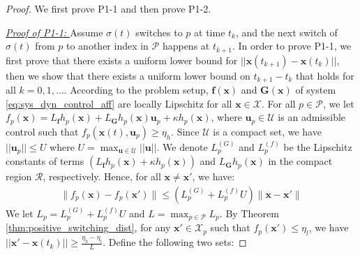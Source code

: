 \documentclass[letterpaper, 10 pt, conference]{ieeeconf}  %
\begin{document}
\begin{proof}
    We first prove P1-1 and then prove P1-2.

    \textit{\underline{Proof of P1-1: }} Assume $\sigma(t)$ switches to $p$ at time $t_k$, and the next switch of $\sigma(t)$ from $p$ to another index in $\mathcal{P}$ happens at $t_{k+1}$. In order to prove P1-1, we first prove that there exists a uniform lower bound for $||\mathbf{x}(t_{k+1}) - \mathbf{x}(t_k)||$, then we show that there exists a uniform lower bound on $t_{k+1}-t_{k}$ that holds for all $k=0,1,\ldots$. According to the problem setup, $\mathbf{f}(\mathbf{x})$ and $\mathbf{G}(\mathbf{x})$ of system \eqref{eq:sys_dyn_control_aff} are locally Lipschitz for all $\mathbf{x}\in\mathcal{X}$. 
    For all $p\in\mathcal{P}$, we let $f_p(\mathbf{x})=L_\mathbf{f}h_p(\mathbf{x}) + L_{\mathbf{G}}h_p(\mathbf{x})\mathbf{u}_p+\kappa h_p(\mathbf{x})$, where $\mathbf{u}_p\in\mathcal{U}$ is an admissible control such that $f_p(\mathbf{x}(t), \mathbf{u}_p)\geq \eta_h$. Since $\mathcal{U}$ is a compact set, we have $||\mathbf{u}_p||\leq U$ where $U=\max_{\mathbf{u}\in\mathcal{U}}||\mathbf{u}||$. We denote $L_{p}^{(G)}$ and $L_{p}^{(f)}$ be the Lipschitz constants of terms $(L_\mathbf{f}h_p(\mathbf{x})+\kappa h_p(\mathbf{x}))$ and $L_{\mathbf{G}}h_p(\mathbf{x})$ in the compact region $\mathcal{R}$, respectively. Hence, for all $\mathbf{x}\neq\mathbf{x}'$, we have:
    \begin{align*}
         \|f_p(\mathbf{x}) - f_p(\mathbf{x}')\|
         \leq (L_p^{(G)} + L_p^{(f)}U)\|\mathbf{x}-\mathbf{x}'\|
    \end{align*}
    We let $L_p = L_p^{(G)} + L_p^{(f)}U$ and $L=\max_{p\in\mathcal{P}}L_p$. 
    By Theorem \ref{thm:positive_switching_dist}, for any $\mathbf{x}'\in\mathcal{X}_p$ such that $f_{p}(\mathbf{x}')\leq \eta_l$, we have $||\mathbf{x}' - \mathbf{x}(t_k)||\geq \frac{\eta_h-\eta_l}{L}$. Define the following two sets: 

\end{proof}
\end{document}
